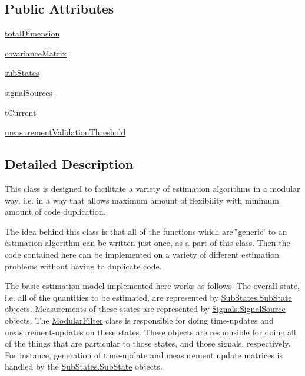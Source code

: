 \subsection*{Public Attributes}
\begin{DoxyCompactItemize}
\item 
\hyperlink{classState_1_1ModularFilter_a40c2ac71e5d1d363f0410ce94b9e8345}{total\+Dimension}
\item 
\hyperlink{classState_1_1ModularFilter_a1981026f261047a45a6a7d89bbf1b7de}{covariance\+Matrix}
\item 
\hyperlink{classState_1_1ModularFilter_af6128daa99126397f282ec0fcdcd3e56}{sub\+States}
\item 
\hyperlink{classState_1_1ModularFilter_a23afc4a8d6b45e56b68ab99d8b9d9efa}{signal\+Sources}
\item 
\hyperlink{classState_1_1ModularFilter_a2b816cacd5988012193b17fcc0032d9d}{t\+Current}
\item 
\hyperlink{classState_1_1ModularFilter_adf637093941f85a6ca14a122f232657a}{measurement\+Validation\+Threshold}
\end{DoxyCompactItemize}


\subsection{Detailed Description}
This class is designed to facilitate a variety of estimation algorithms in a modular way, i.\+e. in a way that allows maximum amount of flexibility with minimum amount of code duplication.

The idea behind this class is that all of the functions which are \char`\"{}generic\char`\"{} to an estimation algorithm can be written just once, as a part of this class. Then the code contained here can be implemented on a variety of different estimation problems without having to duplicate code.

The basic estimation model implemented here works as follows. The overall state, i.\+e. all of the quantities to be estimated, are represented by \hyperlink{classSubStates_1_1SubState}{Sub\+States.\+Sub\+State} objects. Measurements of these states are represented by \hyperlink{classSignals_1_1SignalSource}{Signals.\+Signal\+Source} objects. The \hyperlink{classState_1_1ModularFilter}{Modular\+Filter} class is responsible for doing time-\/updates and measurement-\/updates on these states. These objects are responsible for doing all of the things that are particular to those states, and those signals, respectively. For instance, generation of time-\/update and measurement update matrices is handled by the \hyperlink{classSubStates_1_1SubState}{Sub\+States.\+Sub\+State} objects. 

